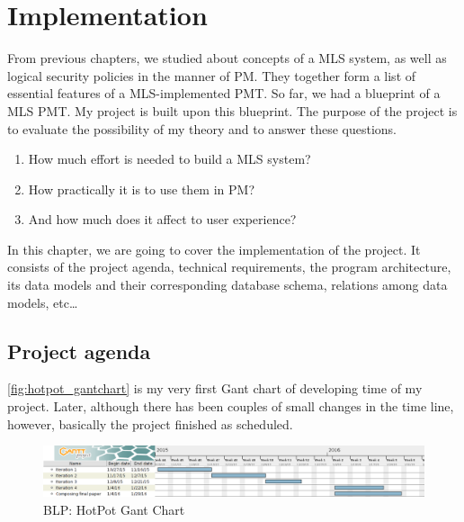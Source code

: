 
\chapter{Implementation} %

\label{ch:implementation} 


From previous chapters, we studied about concepts of a MLS system, as well as logical security policies in the manner of PM.
They together form a list of essential features of a MLS-implemented PMT.
So far, we had a blueprint of a MLS PMT. 
My \myProject project is built upon this blueprint.
The purpose of the project is to evaluate the possibility of my theory and to answer these questions.

\begin{enumerate}
\item How much effort is needed to build a MLS system? 
\item How practically it is to use them in PM?
\item And how much does it affect to user experience?
\end{enumerate}

In this chapter, we are going to cover the implementation of the project.
It consists of the project agenda, technical requirements, the program architecture, its data models and their corresponding database schema, relations among data models, etc\dots


\section{Project agenda}
\label{ch:implementation:project_agenda}

\autoref{fig:hotpot_gantchart} is my very first Gant chart of developing time of my project.
Later, although there has been couples of small changes in the time line, however, basically the project finished as scheduled.

\begin{figure}[bth]                                                                                                                                                  
\myfloatalign
\includegraphics[width=1.0\linewidth]{gfx/chapter_4/hotpot_gantchart}
\caption[HotPot Gant chart]{BLP: HotPot Gant Chart}
\label{fig:hotpot_gantchart}
\end{figure}

